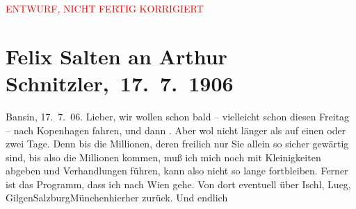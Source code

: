 
\begin{center}
            \textcolor{red}{ENTWURF, NICHT FERTIG KORRIGIERT}
                      \end{center}
            
         
         \renewcommand{\erwaehntePersonen}{Personen: Felix Salten, Ottilie Salten, Olga Schnitzler}
         \renewcommand{\erwaehnteOrte}{Orte: Bad Ischl, Bansin, Deutschland, Kopenhagen, Lueg am Wolfgangsee, Marienlyst, München, Salzburg, St. Gilgen, Weimar, Wien}
         \renewcommand{\erwaehnteWerke}{}
               \section[ Felix Salten an Arthur Schnitzler, 17. 7. 1906]{ Felix Salten an Arthur Schnitzler, 17. 7. 1906}\nopagebreak{}\rehead{ }\begin{ledgroupsized}[t]{13cm}\normalsize\beginnumbering \toendnotes[C]{\smallbreak\pagebreak[2]} 
\toendnotes[C]{\smallbreak}\pstart
           \raggedleft{}{\pb}Bansin, 17. 7. 06.\pend
           \pstart
           Lieber, wir wollen schon bald – vielleicht schon diesen Freitag – nach Kopenhagen fahren, und dann \label{K_L03431-1v}\label{K_L03431-1h}. Aber wol nicht länger als auf einen oder zwei Tage. Denn bis die Millionen,
               deren freilich nur Sie allein so sicher gewärtig sind, bis also die Millionen kommen,
               muß ich mich noch mit Kleinigkeiten abgeben und Verhandlungen führen, kann also nicht
               so lange fortbleiben. Ferner ist das Programm, dass ich nach Wien gehe. Von dort eventuell über Ischl, Lueg, GilgenSalzburgMünchenhierher zurück. Und endlich

\end{ledgroupsized}
